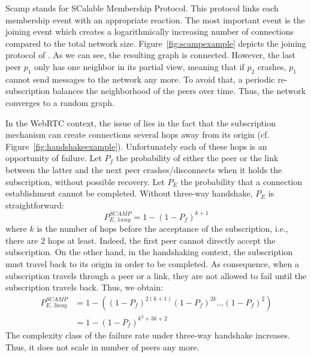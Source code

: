 \begin{asparadesc}
\item [Scamp]\cite{ganesh2001scamp,ganesh2003peer} stands for SCalable
  Membership Protocol. This protocol links each membership event with an
  appropriate reaction.  The most important event is the joining event which
  creates a logarithmically increasing number of connections compared to the
  total network size.  Figure~\ref{fig:scampexample} depicts the joining
  protocol of \SCAMP{}. As we can see, the resulting graph is
  connected. However, the last peer $p_1$ only has one neighbor in its partial
  view, meaning that if $p_2$ crashes, $p_1$ cannot send messages to the
  network any more. To avoid that, a periodic re-subscription balances the
  neighborhood of the peers over time. Thus, the network converges to a random
  graph.

  In the WebRTC context, the issue of \SCAMP{} lies in the fact that the
  subscription mechanism can create connections several hops away from its
  origin (cf. Figure~\ref{fig:handshakeexample}). Unfortunately each of these
  hops is an opportunity of failure. Let $P_f$ the probability of either the
  peer or the link between the latter and the next peer crashes/disconnects
  when it holds the subscription, without possible recovery. Let $P_E$ the
  probability that a connection establishment cannot be completed. Without
  three-way handshake, $P_E$ is straightforward:
  \begin{equation} P_{E,\,1way}^{SCAMP}=1-(1- P_f)^{k+1} \end{equation} where
  $k$ is the number of hops before the acceptance of the subscription, i.e.,
  there are $2$ hops at least. Indeed, the first peer cannot directly accept
  the subscription. On the other hand, in the handshaking context, the
  subscription must travel back to its origin in order to be completed. As
  consequence, when a subscription travels through a peer or a link, they are
  not allowed to fail until the subscription travels back. Thus, we obtain:
  \begin{align} P_{E,\,3way}^{SCAMP} &=1 - ((1-P_f)^{2(k+1)} (1-P_f)^{2k}
                                       \ldots (1-P_f)^2) \nonumber \\
                                     &=1-(1-P_f)^{k^2+3k+2}
  \end{align}
  The complexity class of the \SCAMP{} failure rate under three-way handshake
  increases. Thus, it does not scale in number of peers any more.
\end{asparadesc}


